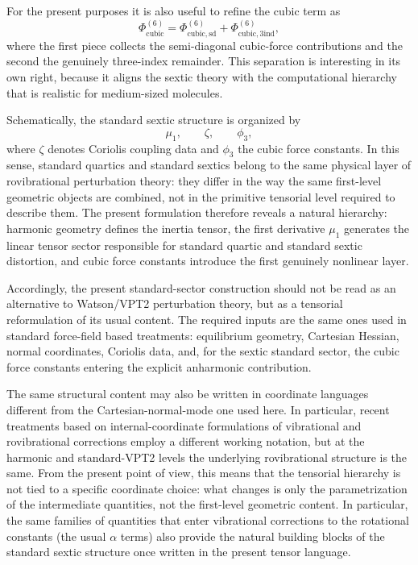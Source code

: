 For the present purposes it is also useful to refine the cubic term as
\begin{equation}
\Phi^{(6)}_{\mathrm{cubic}}
=
\Phi^{(6)}_{\mathrm{cubic,sd}}
+
\Phi^{(6)}_{\mathrm{cubic,3ind}},
\end{equation}
where the first piece collects the semi-diagonal cubic-force
contributions and the second the genuinely three-index remainder. This
separation is interesting in its own right, because it aligns the
sextic theory with the computational hierarchy that is realistic for
medium-sized molecules.

Schematically, the standard sextic structure is organized by
\begin{equation}
\mu_1,\qquad \zeta,\qquad \phi_3,
\end{equation}
where $\zeta$ denotes Coriolis coupling data and $\phi_3$ the cubic
force constants. In this sense, standard quartics and standard sextics
belong to the same physical layer of rovibrational perturbation
theory: they differ in the way the same first-level geometric objects
are combined, not in the primitive tensorial level required to
describe them.
The present formulation therefore reveals a natural hierarchy: harmonic
geometry defines the inertia tensor, the first derivative $\mu_1$
generates the linear tensor sector responsible for standard quartic and
standard sextic distortion, and cubic force constants introduce the
first genuinely nonlinear layer.

Accordingly, the present standard-sector construction should not be
read as an alternative to Watson/VPT2 perturbation theory, but as a
tensorial reformulation of its usual content. The required inputs are
the same ones used in standard force-field based treatments:
equilibrium geometry, Cartesian Hessian, normal coordinates, Coriolis
data, and, for the sextic standard sector, the cubic force constants
entering the explicit anharmonic contribution.

The same structural content may also be written in coordinate
languages different from the Cartesian-normal-mode one used here. In
particular, recent treatments based on internal-coordinate
formulations of vibrational and rovibrational corrections employ a
different working notation, but at the harmonic and standard-VPT2
levels the underlying rovibrational structure is the same.\cite{cubic-internal_2024}
From the present point of view, this means that the tensorial
hierarchy is not tied to a specific coordinate choice: what changes is
only the parametrization of the intermediate quantities, not the
first-level geometric content. In particular, the same families of
quantities that enter vibrational corrections to the rotational
constants (the usual $\alpha$ terms) also provide the natural building
blocks of the standard sextic structure once written in the present
tensor language.

